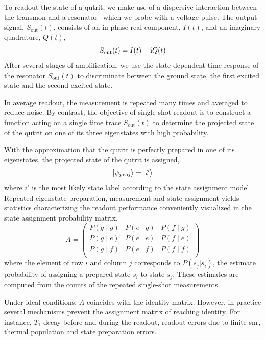 To readout the state of a qutrit, we make use of a dispersive interaction between the transmon and a resonator~\cite{Blais2004CavityComputation, Wallraff2005ApproachingReadout} which we probe with a voltage pulse. The output signal, $S_{\mathrm{out}}(t)$, consists of an in-phase real component, $I(t)$, and an imaginary quadrature, $Q(t)$,
\begin{equation}
    S_{\mathrm{out}}(t) = I(t) + \mathrm i Q(t)
\end{equation}
After several stages of amplification, we use the state-dependent time-response of the resonator $S_{\mathrm{out}}(t)$ to discriminate between the ground state, the first excited state and the second excited state.  

In average readout, the measurement is repeated many times and averaged to reduce noise. By contrast, the objective of single-shot readout is to construct a function acting on a single time trace $S_{\mathrm{out}}(t)$ to determine the projected state of the qutrit on one of its three eigenstates with high probability. 

With the approximation that the qutrit is perfectly prepared in one of its eigenstates, the projected state of the qutrit is assigned,
\begin{equation} \label{eq:max_likelihood_state}
    \ket{\psi_{proj}} = \ket{i'}
\end{equation}
where $i'$ is the most likely state label according to the state assignment model.
Repeated eigenstate preparation, measurement and state assignment yields statistics characterizing the readout performance conveniently visualized in the state assignment probability matrix,
\begin{equation}     \label{eq:state_assignment_probability_matrix}
A = \begin{pmatrix}
P(g \mid g) & P(e \mid g) & P(f \mid g) \\
P(g  \mid e) & P(e \mid e) & P(f \mid e)\\
P(g \mid f) &  P(e \mid f) &  P(f \mid f)\\
\end{pmatrix}
\end{equation}
where the element of row $i$ and column $j$ corresponds to $P(s_j|s_i)$, the estimate probability of assigning a prepared state $s_i$ to state $s_j$. These estimates are computed from the counts of the repeated single-shot measurements.

Under ideal conditions, $A$ coincides with the identity matrix. However, in practice several mechanisms prevent the assignment matrix of reaching identity. For instance, $T_1$ decay before and during the readout, readout errors due to finite \gls{snr}, thermal population and state preparation errors. 

